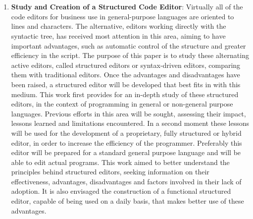 

%
\cleardoublepage
{}


\chapter{}


\begin{englishtext}
\begin{enumerate}

    \item \textbf{Study and Creation of a Structured Code Editor}: Virtually all
    of the code editors for business use in general\hyp{}purpose languages are
    oriented to lines and characters. The alternative, editors working directly
    with the syntactic tree, has received most attention in this area, aiming to
    have important advantages, such as automatic control of the structure and
    greater efficiency in the script. The purpose of this paper is to study
    these alternating active editors, called structured editors or syntax-driven
    editors, comparing them with traditional editors. Once the advantages and
    disadvantages have been raised, a structured editor will be developed that
    best fits in with this medium. This work first provides for an in-depth
    study of these structured editors, in the context of programming in general
    or non-general purpose languages. Previous efforts in this area will be
    sought, assessing their impact, lessons learned and limitations encountered.
    In a second moment these lessons will be used for the development of a
    proprietary, fully structured or hybrid editor, in order to increase the
    efficiency of the programmer. Preferably this editor will be prepared for a
    standard general purpose language and will be able to edit actual programs.
    This work aimed to better understand the principles behind structured
    editors, seeking information on their effectiveness, advantages,
    disadvantages and factors involved in their lack of adoption. It is also
    envisaged the construction of a functional structured editor, capable of
    being used on a daily basis, that makes better use of these advantages.
    \cite{structuredEditorStudy}


\end{enumerate}
\end{englishtext}

